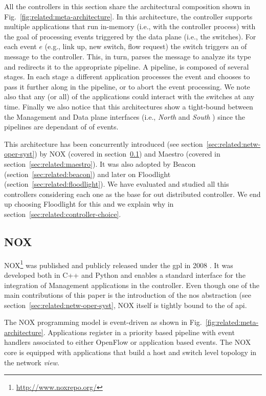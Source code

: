 All the controllers in this section share the architectural composition shown in Fig.~\ref{fig:related:meta-architecture}.
In this architecture, the controller supports multiple applications that run in-memory (i.e., with the controller process) with the goal of processing events  triggered by the data plane (i.e., the switches). 
For each event $e$ (e.g., link up, new switch, flow request) the switch triggers an \gls{of} message to the controller. 
This, in turn, parses  the message to analyze its type and redirects it to the appropriate pipeline. 
A pipeline, is composed of several stages. 
In each stage a different application processes the event and chooses to pass it further along in the pipeline, or to abort the event processing. 
We note also that any (or all) of the applications could interact with the switches at any time. 
Finally we also notice that this architectures  show a tight-bound between the Management and Data plane interfaces (i.e., \emph{North} and \emph{South} ) since the pipelines are dependant of \gls{of} events. 

This architecture has been concurrently introduced (see section~\ref{sec:related:netw-oper-syst}) by NOX (covered in section~\ref{sec:related:nox}) and Maestro (covered in section~\ref{sec:related:maestro}).  It was also adopted by Beacon (section~\ref{sec:related:beacon})  and later on Floodlight (section~\ref{sec:related:floodlight}). 
We have evaluated and studied all this controllers considering each one as the base for out distributed controller. 
We end up choosing Floodlight for this and we explain why in section~\ref{sec:related:controller-choice}. 

\subsection{NOX}
\label{sec:related:nox}

NOX\footnote{\url{http://www.noxrepo.org/}} was published and publicly released under
the \gls{gpl} in 2008 \cite{Gude:2008jd}. 
It was developed both in C++ and Python and enables a standard interface for the integration of  Management applications 
in the controller. 
Even though one of the main contributions of this paper is the introduction of the \gls{nos}  abstraction (see section~\ref{sec:related:netw-oper-syst}, NOX itself  is tightly bound to the \gls{of} \gls{api}. 

The NOX programming model is event-driven as shown in Fig.~\ref{fig:related:meta-architecture}.
Applications  register in a
priority based pipeline with event handlers associated to either OpenFlow  or application based events. 
The NOX core is equipped with applications that build a host and switch level topology in the network \emph{view}. 

